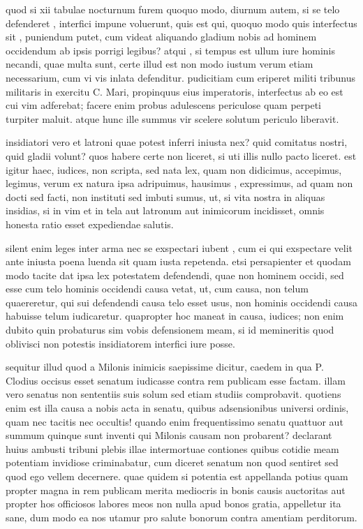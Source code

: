  quod si xii tabulae nocturnum furem quoquo modo, diurnum autem, si se telo defenderet , interfici impune voluerunt, quis est qui, quoquo modo quis interfectus sit , puniendum putet, cum videat aliquando gladium nobis ad hominem occidendum ab ipsis porrigi legibus? atqui , si tempus est ullum iure hominis necandi, quae multa sunt, certe illud est non modo iustum verum etiam necessarium, cum vi vis inlata defenditur. pudicitiam cum eriperet militi tribunus militaris in exercitu C. Mari, propinquus eius imperatoris, interfectus ab eo est cui vim adferebat; facere enim probus adulescens periculose quam perpeti turpiter maluit. atque hunc ille summus vir scelere solutum periculo liberavit.

 insidiatori vero et latroni quae potest inferri iniusta nex? quid comitatus nostri, quid gladii volunt? quos habere certe non liceret, si uti illis nullo pacto liceret. est igitur haec, iudices, non scripta, sed nata lex, quam non didicimus, accepimus, legimus, verum ex natura ipsa adripuimus, hausimus , expressimus, ad quam non docti sed facti, non instituti sed imbuti sumus, ut, si vita nostra in aliquas insidias, si in vim et in tela aut latronum aut inimicorum incidisset, omnis honesta ratio esset expediendae salutis.

 silent enim leges inter arma nec se exspectari iubent , cum ei qui exspectare velit ante iniusta poena luenda sit quam iusta repetenda. etsi persapienter et quodam modo tacite dat ipsa lex potestatem defendendi, quae non hominem occidi, sed esse cum telo hominis occidendi causa vetat, ut, cum causa, non telum quaereretur, qui sui defendendi causa telo esset usus, non hominis occidendi causa habuisse telum iudicaretur. quapropter hoc maneat in causa, iudices; non enim dubito quin probaturus sim vobis defensionem meam, si id memineritis quod oblivisci non potestis insidiatorem interfici iure posse.

 sequitur illud quod a Milonis inimicis saepissime dicitur, caedem in qua P. Clodius occisus esset senatum iudicasse contra rem publicam esse factam. illam vero senatus non sententiis suis solum sed etiam studiis comprobavit. quotiens enim est illa causa a nobis acta in senatu, quibus adsensionibus universi ordinis, quam nec tacitis nec occultis! quando enim frequentissimo senatu quattuor aut summum quinque sunt inventi qui Milonis causam non probarent? declarant huius ambusti tribuni plebis illae intermortuae contiones quibus cotidie meam potentiam invidiose criminabatur, cum diceret senatum non quod sentiret sed quod ego vellem decernere. quae quidem si potentia est appellanda potius quam propter magna in rem publicam merita mediocris in bonis causis auctoritas aut propter hos officiosos labores meos non nulla apud bonos gratia, appelletur ita sane, dum modo ea nos utamur pro salute bonorum contra amentiam perditorum.

